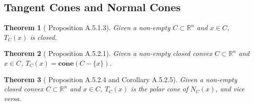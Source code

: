 \documentclass[openany]{book}
\newtheorem{theorem}{Theorem}[chapter]
\theoremstyle{definition}
\theoremstyle{remark}
\begin{document}
\subsection{Tangent Cones and Normal Cones}
\begin{theorem}[\cite{HL12} Proposition A.5.1.3]
    Given a non-empty $C\subset \mathbb{R}^n$ and $x\in C$, $T_C(x)$ is closed.
\end{theorem}
\begin{theorem}[\cite{HL12} Proposition A.5.2.1]
    Given a non-empty closed convex $C\subset \mathbb{R}^n$ and $x\in C$, $T_C(x)=\overline{\mathbf{cone}}(C-\{x\})$.
\end{theorem}
\begin{theorem}[\cite{HL12} Proposition A.5.2.4 and Corollary A.5.2.5]
    Given a non-empty closed convex $C\subset \mathbb{R}^n$ and $x\in C$, $T_C(x)$ is the polar cone of $N_C(x)$, and vice versa.
\end{theorem}
\end{document}
